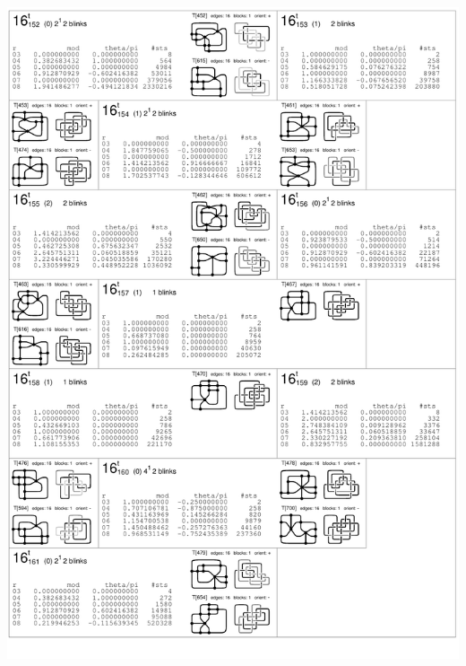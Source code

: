 \begin{center}
 \includegraphics[height=23.5cm]{E.figsbw2/con3catalog030_bw.pdf} \eject

\end{center}
